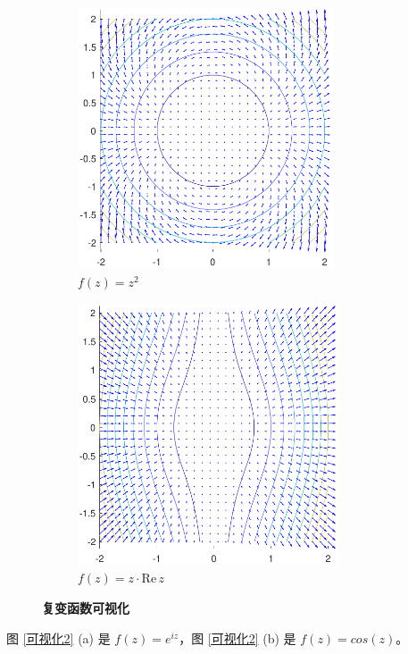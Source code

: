 \documentclass[UTF8]{report}
\def\Re{\mathrm{Re\,}}
\theoremstyle{MyLineTheoremStyle} %
\theoremstyle{MyBlockTheoremStyle} %
\theoremstyle{MySubsubsectionStyle} %
\begin{document}
\begin{figure}[H]\centering
\begin{subfigure}[t]{0.49\textwidth}\centering
    \includegraphics[height=220pt]{assets/1,2/z^2.pdf}
    \caption{\bfseries $f(z) = z^2$ }
\end{subfigure}\begin{subfigure}[t]{0.49\textwidth}\centering
    \includegraphics[height=220pt]{assets/1,2/zRez.pdf}
    \caption{\bfseries $f(z) = z\cdot \Re z$ }
\end{subfigure}
\caption{\bfseries 复变函数可视化 }\label{可视化1}
\end{figure}

图 \ref{可视化2} (a) 是 $f(z) = e^{iz}$，图 \ref{可视化2} (b) 是 $f(z) = cos(z)$。
\end{document}
